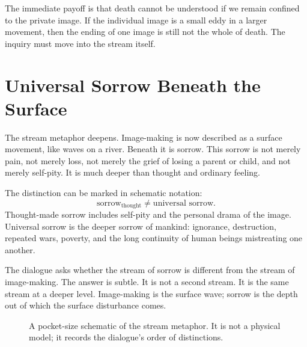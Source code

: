 The immediate payoff is that death cannot be understood if we remain confined to the private image. If the individual image is a small eddy in a larger movement, then the ending of one image is still not the whole of death. The inquiry must move into the stream itself.

\section{Universal Sorrow Beneath the Surface}

The stream metaphor deepens. Image-making is now described as a surface movement, like waves on a river. Beneath it is sorrow. This sorrow is not merely pain, not merely loss, not merely the grief of losing a parent or child, and not merely self-pity. It is much deeper than thought and ordinary feeling.

The distinction can be marked in schematic notation:
\begin{equation}
\text{sorrow}_{\mathrm{thought}}
\neq
\text{universal sorrow}.
\end{equation}
Thought-made sorrow includes self-pity and the personal drama of the image. Universal sorrow is the deeper sorrow of mankind: ignorance, destruction, repeated wars, poverty, and the long continuity of human beings mistreating one another.

The dialogue asks whether the stream of sorrow is different from the stream of image-making. The answer is subtle. It is not a second stream. It is the same stream at a deeper level. Image-making is the surface wave; sorrow is the depth out of which the surface disturbance comes.

\begin{figure}
\centering
{}
\caption{A pocket-size schematic of the stream metaphor. It is not a physical model; it records the dialogue's order of distinctions.}
\end{figure}

